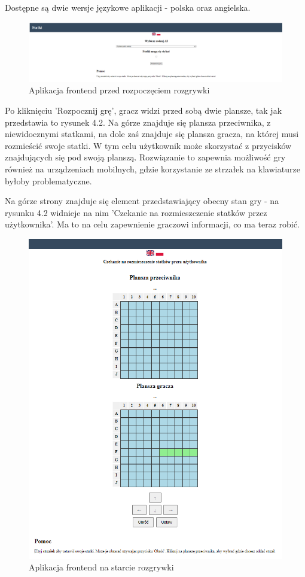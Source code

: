 Dostępne są dwie wersje językowe aplikacji - polska oraz angielska.

\begin{figure}[!h]
    \label{fig:frontend-start}
    \centering \includegraphics[width=1\linewidth]{img/frontend-start.PNG}
    \caption{Aplikacja frontend przed rozpoczęciem rozgrywki}
\end{figure}

Po kliknięciu 'Rozpocznij grę', gracz widzi przed sobą dwie plansze, tak jak przedstawia to rysunek 4.2. Na górze znajduje się plansza przeciwnika, z niewidocznymi statkami, na dole zaś znajduje się plansza gracza, na której musi rozmieścić swoje statki. W tym celu użytkownik może skorzystać z przycisków znajdujących się pod swoją planszą. Rozwiązanie to zapewnia możliwość gry również na urządzeniach mobilnych, gdzie korzystanie ze strzałek na klawiaturze byłoby problematyczne.

\indent Na górze strony znajduje się element przedstawiający obecny stan gry - na rysunku 4.2 widnieje na nim 'Czekanie na rozmieszczenie statków przez użytkownika'. Ma to na celu zapewnienie graczowi informacji, co ma teraz robić.

\begin{figure}[!h]
    \label{fig:frontend-game}
    \centering \includegraphics[width=1\linewidth]{img/frontend-game.PNG}
    \caption{Aplikacja frontend na starcie rozgrywki}
\end{figure}

